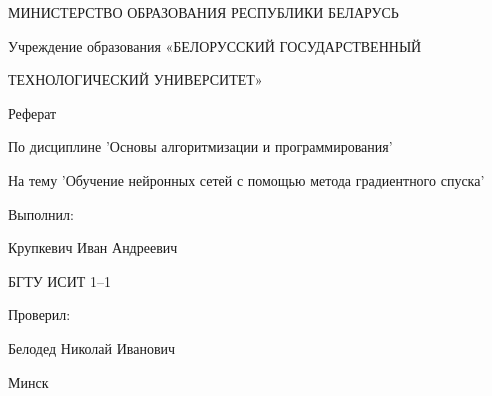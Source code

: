 \documentclass{article}
\begin{document}
    \begin{titlepage}

        \Large

        \begin{center}
            
            
            МИНИСТЕРСТВО ОБРАЗОВАНИЯ РЕСПУБЛИКИ БЕЛАРУСЬ

            Учреждение образования «БЕЛОРУССКИЙ ГОСУДАРСТВЕННЫЙ 

            ТЕХНОЛОГИЧЕСКИЙ УНИВЕРСИТЕТ»

        \end{center}
        
        \vspace{4cm}
        
        Реферат
        
        По дисциплине 'Основы алгоритмизации и программирования'

        На тему 'Обучение нейронных сетей с помощью метода градиентного спуска'
        
        \vspace{4cm}
        
        \begin{flushright}
            Выполнил:
            
            Крупкевич Иван Андреевич

            БГТУ ИСИТ 1--1
        \end{flushright}

        \vspace{2cm}

        \begin{flushright}
            Проверил:
            
            Белодед Николай Иванович
        \end{flushright}
        
        
        \vspace{\fill}
        
        \begin{center}
            Минск \the\year
        \end{center}

    \end{titlepage}


    
    \renewcommand{\contentsname}{Содержание}
    
    \tableofcontents
    \newpage
    
\end{document}
